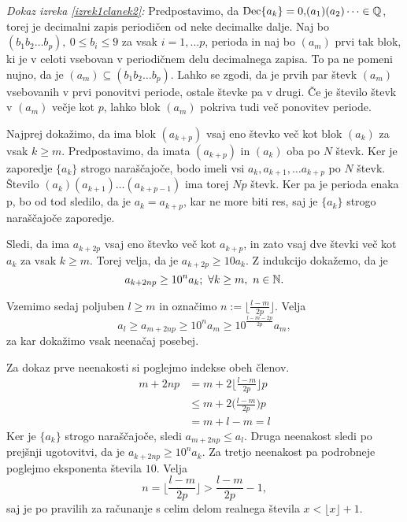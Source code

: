 \documentclass[twoside,11pt]{article}
\begin{document}
\noindent
{\em Dokaz izreka \ref{izrek1clanek2}:\/} Predpostavimo, da $\text{Dec}\{a_k\} = 0{,}(a_1)(a_2)\dots \in \mathbb{Q}$,
 torej je decimalni zapis periodičen od neke decimalke dalje. Naj bo
$(b_1b_2 \dots b_p), \ 0 \leq b_i \leq 9$ za vsak $i = 1, \dots p$, perioda in naj bo
$(a_m)$ prvi tak blok, ki je v celoti vsebovan v periodičnem delu decimalnega zapisa.
To pa ne pomeni nujno, da je $(a_m) \subseteq (b_1b_2 \dots b_p)$. Lahko se zgodi, da je prvih par števk
$(a_m)$ vsebovanih v prvi ponovitvi periode, ostale števke pa v drugi. Če je število števk v $(a_m)$ večje kot $p$,
lahko blok $(a_m)$ pokriva tudi več ponovitev periode.

Najprej dokažimo, da ima blok $(a_{k+p})$ vsaj eno števko več kot blok $(a_k)$ za vsak $k \geq m$.
Predpostavimo, da imata $(a_{k+p})$ in $(a_k)$ oba po $N$ števk. 
Ker je zaporedje $\{a_k\}$ strogo naraščajoče, bodo imeli vsi $a_k, a_{k+1}, \dots a_{k+p}$ po $N$ števk.
Število $(a_k)(a_{k+1})\dots (a_{k+p-1})$ ima torej $Np$ števk. Ker pa je perioda enaka p,
bo od tod sledilo, da je $a_k = a_{k+p}$, kar ne more biti res, saj je $\{a_k\}$ strogo naraščajoče zaporedje.

Sledi, da ima $a_{k+ 2p}$ vsaj eno števko več kot $a_{k+p}$, in zato vsaj dve števki več kot $a_k$
za vsak $k \geq m$.
Torej velja, da je $a_{k+2p} \geq 10 a_k$. Z indukcijo dokažemo, da je 
\[ a_{k+2np} \geq 10^n a_k; \ \forall k \geq m, \ n \in \mathbb{N}.\]

Vzemimo sedaj poljuben $l \geq m$ in označimo $n := \lfloor \frac{l-m}{2p} \rfloor$.
Velja 
\begin{equation}\label{enacba1}
    a_l \geq a_{m+2np} \geq 10^n a_m \geq 10 ^{\frac{l-m-2p}{2p}}a_m,
\end{equation}
za kar dokažimo vsak neenačaj posebej.

Za dokaz prve neenakosti si poglejmo indekse obeh členov. 
\[
    \begin{split}
    m + 2np &= m + 2 \bigg\lfloor \frac{l-m}{2p}\bigg\rfloor p \\
    &\leq m + 2\bigg(\frac{l-m}{2p}\bigg)p \\
    &= m + l - m = l
    \end{split}
    \] 
Ker je $\{a_k\}$ strogo naraščajoče, sledi $a_{m+2np} \leq a_l$.
Druga neenakost sledi po prejšnji ugotovitvi, da je $a_{k+2np} \geq 10^n a_k$.
Za tretjo neenakost pa podrobneje poglejmo eksponenta števila $10$. Velja
\[
    n = \bigg\lfloor \frac{l-m}{2p}\bigg\rfloor > \frac{l-m}{2p} - 1,
     \]
saj je po pravilih za računanje s celim delom realnega števila $x < \lfloor x\rfloor + 1$.
\end{document}
